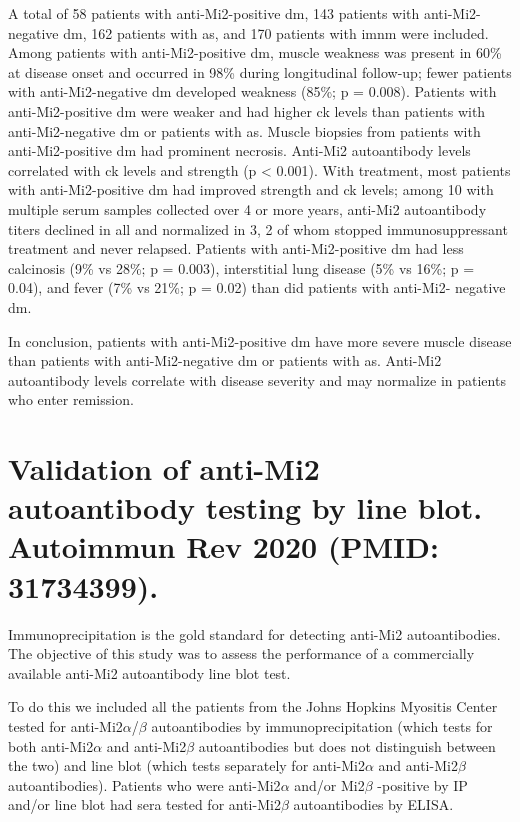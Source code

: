 A total of 58 patients with anti-Mi2-positive \gls{dm}, 143 patients with anti-Mi2-negative \gls{dm}, 162 patients with \gls{as}, and 170 patients with \gls{imnm} were included. Among patients with anti-Mi2-positive \gls{dm}, muscle weakness was present in 60\% at disease onset and occurred in 98\% during longitudinal follow-up; fewer patients with anti-Mi2-negative \gls{dm} developed weakness (85\%; p = 0.008). Patients with anti-Mi2-positive \gls{dm} were weaker and had higher \gls{ck} levels than patients with anti-Mi2-negative \gls{dm} or patients with \gls{as}. Muscle biopsies from patients with anti-Mi2-positive \gls{dm} had prominent necrosis. Anti-Mi2 autoantibody levels correlated with \gls{ck} levels and strength (p < 0.001). With treatment, most patients with anti-Mi2-positive \gls{dm} had improved strength and \gls{ck} levels; among 10 with multiple serum samples collected over 4 or more years, anti-Mi2 autoantibody titers declined in all and normalized in 3, 2 of whom stopped immunosuppressant treatment and never relapsed. Patients with anti-Mi2-positive \gls{dm} had less calcinosis (9\% vs 28\%; p = 0.003), interstitial lung disease (5\% vs 16\%; p = 0.04), and fever (7\% vs 21\%; p = 0.02) than did patients with anti-Mi2- negative \gls{dm}.

In conclusion, patients with anti-Mi2-positive \gls{dm} have more severe muscle disease than patients with anti-Mi2-negative \gls{dm} or patients with \gls{as}. Anti-Mi2 autoantibody levels correlate with disease severity and may normalize in patients who enter remission.


{\cleardoublepage}

\section{Validation of anti-Mi2 autoantibody testing by line blot. Autoimmun Rev 2020 (PMID: 31734399).}
\label{sec:mi2_serologic}

Immunoprecipitation is the gold standard for detecting anti-Mi2 autoantibodies. The objective of this study was to assess the performance of a commercially available anti-Mi2 autoantibody line blot test.

To do this we included all the patients from the Johns Hopkins Myositis Center tested for anti-Mi2$\alpha$/$\beta$ autoantibodies by immunoprecipitation (which tests for both anti-Mi2$\alpha$ and anti-Mi2$\beta$ autoantibodies but does not distinguish between the two) and line blot (which tests separately for anti-Mi2$\alpha$ and anti-Mi2$\beta$ autoantibodies).  Patients who were anti-Mi2$\alpha$ and/or Mi2$\beta$ -positive by IP and/or line blot had sera tested for anti-Mi2$\beta$  autoantibodies by ELISA.     

